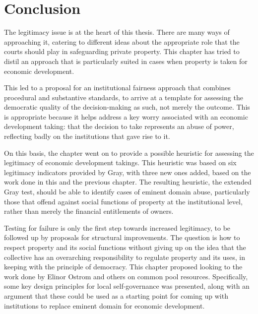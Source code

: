 \section{Conclusion}\label{sec:3:7}

The legitimacy issue is at the heart of this thesis. There are many ways of approaching it, catering to different ideas about the appropriate role that the courts should play in safeguarding private property. This chapter has tried to distil an approach that is particularly suited in cases when property is taken for economic development. 

This led to a proposal for an institutional fairness approach that combines procedural and substantive standards, to arrive at a template for assessing the democratic quality of the decision-making as such, not merely the outcome. This is appropriate because it helps address a key worry associated with an economic development taking: that the decision to take represents an abuse of power, reflecting badly on the institutions that gave rise to it.

On this basis, the chapter went on to provide a possible heuristic for assessing the legitimacy of economic development takings. This heuristic was based on six legitimacy indicators provided by Gray, with three new ones added, based on the work done in this and the previous chapter. The resulting heuristic, the extended Gray test, should be able to identify cases of eminent domain abuse, particularly those that offend against social functions of property at the institutional level, rather than merely the financial entitlements of owners.

Testing for failure is only the first step towards increased legitimacy, to be followed up by proposals for structural improvements. The question is how to respect property and its social functions without giving up on the idea that the collective has an overarching responsibility to regulate property and its uses, in keeping with the principle of democracy. This chapter proposed looking to the work done by Elinor Ostrom and others on common pool resources. Specifically, some key design principles for local self-governance was presented, along with an argument that these could be used as a starting point for coming up with institutions to replace eminent domain for economic development.

